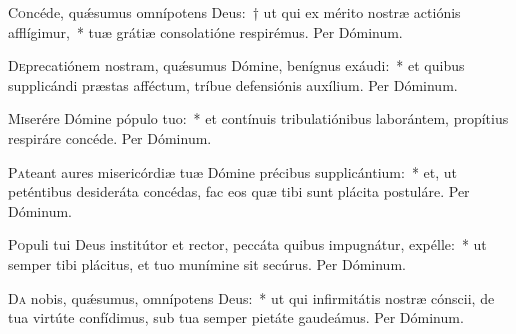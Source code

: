 \documentclass[vesperale_romanum.tex]{subfiles}
\begin{document}
\oratio

\lettrine{C}{o}ncéde, quǽsumus omnípotens Deus:~† ut qui ex mérito nostræ actiónis afflígimur,~* tuæ grátiæ consolatióne respirémus.
Per Dóminum.






\oratio

\lettrine{D}{e}precatiónem nostram, quǽsumus Dómine, benígnus exáudi:~* et quibus supplicándi præstas afféctum, tríbue defensiónis auxílium. Per Dóminum.



\oratio

\lettrine{M}{i}serére Dómine pópulo tuo:~* et contínuis tribulatiónibus laborántem, propítius respiráre concéde. Per Dóminum.



\oratio

\lettrine{P}{a}teant aures misericórdiæ tuæ Dómine précibus supplicántium:~* et, ut peténtibus desideráta concédas, fac eos quæ tibi sunt plácita postuláre.
Per Dóminum.



\oratio

\lettrine{P}{o}puli tui Deus institútor et rector, peccáta quibus impugnátur, expélle:~* ut semper tibi plácitus, et tuo munímine sit secúrus. Per Dóminum.



\oratio

\lettrine{D}{a}  nobis, quǽsumus, omnípotens Deus:~* ut qui infirmitátis nostræ cónscii, de tua virtúte confídimus, sub tua semper pietáte gaudeámus.
Per Dóminum.
\end{document}
